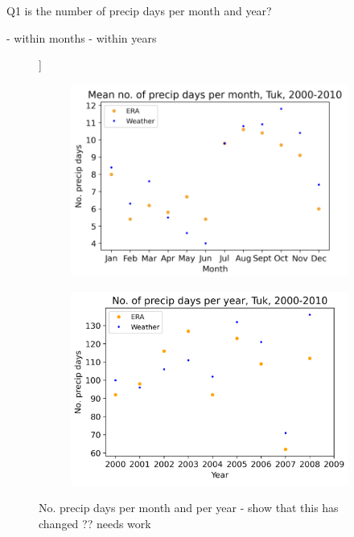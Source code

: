 \documentclass[draft]{agujournal2019}
\begin{document}
Q1 is the number of precip days per month and year?

- within months
- within years 

\begin{figure}[h!tbp]]
\centering
\begin{subfigure}[b]{0.55\textwidth}
   \includegraphics[width=1\linewidth]{figures/no_precip_days_per_month_tuk_10_20.png}
   \caption{}
   \label{fig:Ng1} 
\end{subfigure}

\begin{subfigure}[b]{0.55\textwidth}
   \includegraphics[width=1\linewidth]{figures/no_precip_days_per_year_tuk_10_20.png}
   \caption{}
   \label{fig:Ng2}
\end{subfigure}

\caption{No. precip days per month and per year - show that this has changed ?? needs work }
\end{figure}
\end{document}
